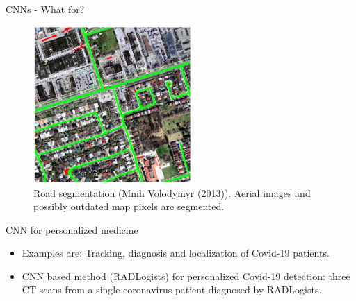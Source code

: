 \begin{vbframe}{CNNs - What for?}
  \begin{figure}
    \centering
    \includegraphics[width=6cm]{figure/road_seg.png}
    \caption{Road segmentation (Mnih Volodymyr (2013)). Aerial images and possibly outdated map pixels are segmented.}
  \end{figure}
\framebreak

\begin{figure}
  \centering
\end{figure}

{CNN for personalized medicine}
  \begin{itemize}
    \item Examples are: Tracking, diagnosis and localization of Covid-19 patients.
    \item CNN based method (RADLogists) for personalized Covid-19 detection: three CT scans from a single coronavirus patient diagnosed by RADLogists.
  \end{itemize}
  

\end{vbframe}
